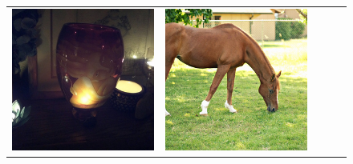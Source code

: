 \begin{figure}
  \centering
  \renewcommand{\arraystretch}{1.4}
  \begin{tabular}{>{\raggedright}*{5}{p{.17\textwidth}}}
    \toprule
    \includegraphics[width=\linewidth]{fig/thumb/cocoqa1.jpg} &
    \includegraphics[width=\linewidth]{fig/thumb/cocoqa2.jpg} &

\end{tabular}
\end{figure}
